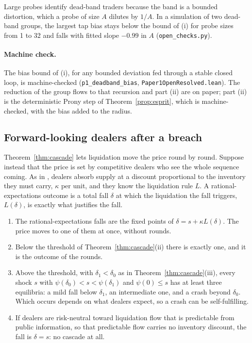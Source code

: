 Large probes identify dead-band traders because the band is a bounded distortion, which a probe of size $A$ dilutes by $1/A$. In a simulation of two dead-band groups, the largest tap bias stays below the bound of (i) for probe sizes from 1 to 32 and falls with fitted slope $-0.99$ in $A$ (\nolinkurl{open_checks.py}).

\paragraph{Machine check.} The bias bound of (i), for any bounded deviation fed through a stable closed loop, is machine-checked (\texttt{p1\_deadband\_bias}, \nolinkurl{Paper1OpenResolved.lean}). The reduction of the group flows to that recursion and part (ii) are on paper; part (ii) is the deterministic Prony step of Theorem~\ref{prop:esprit}, which is machine-checked, with the bias added to the radius.

\subsection{Forward-looking dealers after a breach}

Theorem~\ref{thm:cascade} lets liquidation move the price round by round. Suppose instead that the price is set by competitive dealers who see the whole sequence coming. As in \citet{grossman1988}, dealers absorb supply at a discount proportional to the inventory they must carry, $\kappa$ per unit, and they know the liquidation rule $L$. A rational-expectations outcome is a total fall $\delta$ at which the liquidation the fall triggers, $L(\delta)$, is exactly what justifies the fall.

\begin{proposition}\label{prop:reecascade}
\begin{enumerate}[label=(\roman*),itemsep=1pt]
\item The rational-expectations falls are the fixed points of $\delta=s+\kappa L(\delta)$. The price moves to one of them at once, without rounds.
\item Below the threshold of Theorem~\ref{thm:cascade}(ii) there is exactly one, and it is the outcome of the rounds.
\item Above the threshold, with $\delta_1<\delta_0$ as in Theorem~\ref{thm:cascade}(iii), every shock $s$ with $\psi(\delta_0)<s<\psi(\delta_1)$ and $\psi(0)\le s$ has at least three equilibria: a mild fall below $\delta_1$, an intermediate one, and a crash beyond $\delta_0$. Which occurs depends on what dealers expect, so a crash can be self-fulfilling.
\item If dealers are risk-neutral toward liquidation flow that is predictable from public information, so that predictable flow carries no inventory discount, the fall is $\delta=s$: no cascade at all.
\end{enumerate}
\end{proposition}

